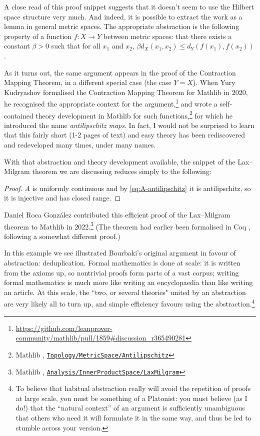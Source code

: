 \documentclass[runningheads]{llncs}
\begin{document}
A close read of this proof snippet
suggests that it doesn't seem to use the Hilbert space structure very much.
And indeed, it is possible to extract the work as a lemma in general metric spaces.
The appropriate abstraction is the following property of a function $f:X\to Y$ between metric spaces:
that there exists a constant $\beta>0$ such that for all $x_1$ and $x_2$,
$\beta d_X(x_1,x_2)\le d_Y(f(x_1),f(x_2))$.

As it turns out,
the same argument appears in the proof of the Contraction Mapping Theorem,
in a different special case (the case $Y = X$).
When Yury Kudryashov formalised the Contraction Mapping Theorem for Mathlib in 2020,
he recognised the appropriate context for the argument,\footnote{
  \url{https://github.com/leanprover-community/mathlib/pull/1859\#discussion\_r365490281}}
and wrote a self-contained theory development in Mathlib for such functions,\footnote{
  Mathlib \cite{Mathlib}, \href{https://github.com/leanprover-community/mathlib4/blob/21b3a48ba0f69a4ae9eb44dbacbc4de43a6290bf/Mathlib/Topology/MetricSpace/Antilipschitz.lean}{\texttt{Topology/MetricSpace/Antilipschitz}}}
for which he introduced the name \emph{antilipschitz maps}.
In fact, I would not be surprised to learn that this fairly short (1-2 pages of text) and easy theory
has been rediscovered and redeveloped many times, under many names.

With that abstraction and theory development available,
the snippet of the Lax--Milgram theorem we are discussing reduces simply to the following:

\begin{proof}
  $A$ is uniformly continuous and by \cref{eq:A-antilipschitz} it is antilipschitz, so it is injective and has closed range.
\end{proof}

Daniel Roca Gonz\'alez contributed this efficient proof of the Lax--Milgram theorem to Mathlib in 2022.\footnote{
  Mathlib \cite{Mathlib}, \href{https://github.com/leanprover-community/mathlib4/blob/21b3a48ba0f69a4ae9eb44dbacbc4de43a6290bf/Mathlib/Analysis/InnerProductSpace/LaxMilgram.lean}{\texttt{Analysis/InnerProductSpace/LaxMilgram}}}
(The theorem had earlier been formalised in Coq \cite{BCFMM17}, following a somewhat different proof.)

In this example we see illustrated Bourbaki's original argument in favour of abstraction: deduplication.
Formal mathematics is done at scale:
 it 
is written from the axioms up,
so nontrivial proofs form parts of a vast corpus;
writing formal mathematics is much more like writing an encyclopaedia than like writing an article.
At this scale,
the ``two, or several theories" united by an abstraction
are very likely all to turn up,
and simple efficiency favours using the abstraction.\footnote{
To believe that habitual abstraction really will avoid the repetition of proofs at large scale,
you must be something of a Platonist:
you must believe (as I do!) that the ``natural context'' of an argument is sufficiently unambiguous
that others who need it will formulate it in the same way,
and thus be led to stumble across your version.
}
\end{document}
